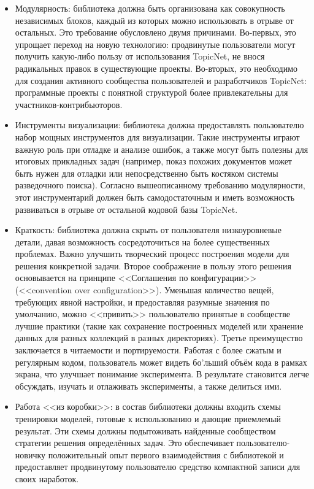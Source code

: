 \begin{itemize}

\item{Модулярность: библиотека должна быть организована как совокупность независимых блоков, каждый из которых можно использовать в отрыве от остальных. Это требование обусловлено двумя причинами. Во-первых, это упрощает переход на новую технологию: продвинутые пользователи могут получить какую-либо пользу от использования TopicNet, не внося радикальных правок в существующие проекты. Во-вторых, это необходимо для создания активного сообщества пользователей и разработчиков TopicNet: программные проекты с понятной структурой более привлекательны для участников-контрибьюторов.} 
\item{Инструменты визуализации: библиотека должна предоставлять пользователю набор мощных инструментов для визуализации.  Такие инструменты играют важную роль при отладке и анализе ошибок, а также могут быть полезны для итоговых прикладных задач (например, показ похожих документов может быть нужен для отладки или непосредственно быть костяком системы разведочного поиска).  Согласно вышеописанному требованию модулярности, этот инструментарий должен быть самодостаточным и иметь возможность развиваться в отрыве от остальной кодовой базы TopicNet.} 
\item{Краткость: библиотека должна скрыть от пользователя низкоуровневые детали, давая возможность сосредоточиться на более существенных проблемах. Важно улучшить творческий процесс построения модели для решения конкретной задачи.  Второе соображение в пользу этого решения основывается на принципе <<Соглашения по конфигурации>> (<<convention over configuration>>). Уменьшая количество вещей, требующих явной настройки, и предоставляя разумные значения по умолчанию, можно <<привить>> пользователю принятые в сообществе лучшие практики (такие как сохранение построенных моделей или хранение данных для разных коллекций в разных директориях).  Третье преимущество заключается в читаемости и портируемости. Работая с более сжатым и регулярным кодом, пользователь может видеть бо'льший объём кода в рамках экрана, что улучшает понимание эксперимента. В результате становится легче обсуждать, изучать и отлаживать эксперименты, а также делиться ими.} 
\item{Работа <<из коробки>>: в состав библиотеки должны входить схемы тренировки моделей, готовые к использованию и дающие приемлемый результат. Эти схемы должны подытоживать найденные сообществом стратегии решения определённых задач. Это обеспечивает пользователю-новичку положительный опыт первого взаимодействия с библиотекой и предоставляет продвинутому пользователю средство компактной записи для своих наработок.} 
\end{itemize}

